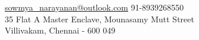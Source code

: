 
\nobreakvspace{0.3em}  %


\noindent\href{mailto:sowmya_narayanan@outlook.com}{sowmya\_narayanan\mbox{}@\mbox{}outlook.com}\sbull
\textsmaller{+}91-8939268550
\\
35 Flat A Master Enclave, Mounasamy Mutt Street 
\\
Villivakam, Chennai - 600 049
